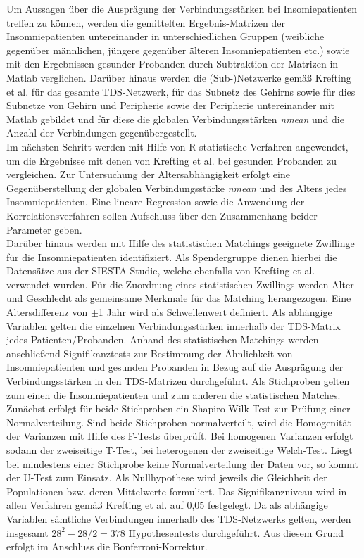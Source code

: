 Um Aussagen über die Ausprägung der Verbindungsstärken bei Insomiepatienten treffen zu können, werden die gemittelten Ergebnis-Matrizen der Insomniepatienten untereinander in unterschiedlichen Gruppen (weibliche gegenüber männlichen, jüngere gegenüber älteren Insomniepatienten etc.) sowie mit den Ergebnissen gesunder Probanden durch Subtraktion der Matrizen in Matlab verglichen. Darüber hinaus werden die (Sub-)Netzwerke gemäß Krefting et al. für das gesamte \acs{TDS}-Netzwerk, für das Subnetz des Gehirns sowie für dies Subnetze von Gehirn und Peripherie sowie der Peripherie untereinander mit Matlab gebildet und für diese die globalen Verbindungsstärken \textit{nmean} und die Anzahl der Verbindungen gegenübergestellt.\\

Im nächsten Schritt werden mit Hilfe von R statistische Verfahren angewendet, um die Ergebnisse mit denen von Krefting et al. bei gesunden Probanden zu vergleichen. Zur Untersuchung der Altersabhängigkeit erfolgt eine Gegenüberstellung der globalen Verbindungsstärke \textit{nmean} und des Alters jedes Insomniepatienten. Eine lineare Regression sowie die Anwendung der Korrelationsverfahren sollen Aufschluss über den Zusammenhang beider Parameter geben.\\

Darüber hinaus werden mit Hilfe des statistischen Matchings geeignete Zwillinge für die Insomniepatienten identifiziert. Als Spendergruppe dienen hierbei die Datensätze aus der SIESTA-Studie, welche ebenfalls von Krefting et al. verwendet wurden. Für die Zuordnung eines statistischen Zwillings werden Alter und Geschlecht als gemeinsame Merkmale für das Matching herangezogen. Eine Altersdifferenz von $\pm$1 Jahr wird als Schwellenwert definiert. Als abhängige Variablen gelten die einzelnen Verbindungsstärken innerhalb der \acs{TDS}-Matrix jedes Patienten/Probanden. Anhand des statistischen Matchings werden anschließend Signifikanztests zur Bestimmung der Ähnlichkeit von Insomniepatienten und gesunden Probanden in Bezug auf die Ausprägung der Verbindungsstärken in den \acs{TDS}-Matrizen durchgeführt. Als Stichproben gelten zum einen die Insomniepatienten und zum anderen die statistischen Matches. Zunächst erfolgt für beide Stichproben ein Shapiro-Wilk-Test zur Prüfung einer Normalverteilung. Sind beide Stichproben normalverteilt, wird die Homogenität der Varianzen mit Hilfe des F-Tests überprüft. Bei homogenen Varianzen erfolgt sodann der zweiseitige T-Test, bei heterogenen der zweiseitige Welch-Test. Liegt bei mindestens einer Stichprobe keine Normalverteilung der Daten vor, so kommt der U-Test zum Einsatz. Als Nullhypothese wird jeweils die Gleichheit der Populationen bzw. deren Mittelwerte formuliert. Das Signifikanzniveau wird in allen Verfahren gemäß Krefting et al. auf 0,05 festgelegt. Da als abhängige Variablen sämtliche Verbindungen innerhalb des \acs{TDS}-Netzwerks gelten, werden insgesamt $28^2-28/2 = 378$ Hypothesentests durchgeführt. Aus diesem Grund erfolgt im Anschluss die Bonferroni-Korrektur.\\

